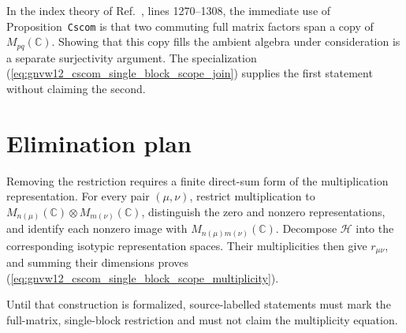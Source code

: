 \documentclass{article}
\begin{document}
In the index theory of Ref.~\cite{Gross2012IndexTheory}, lines 1270--1308, the
immediate use of Proposition~\texttt{Cscom} is that two commuting full matrix
factors span a copy of $M_{pq}(\mathbb C)$. Showing that this copy fills the
ambient algebra under consideration is a separate surjectivity argument. The specialization
(\ref{eq:gnvw12_cscom_single_block_scope_join}) supplies the first statement
without claiming the second.

\section{Elimination plan}

Removing the restriction requires a finite direct-sum form of the
multiplication representation. For every pair $(\mu,\nu)$, restrict
multiplication to
$M_{n(\mu)}(\mathbb C)\otimes M_{m(\nu)}(\mathbb C)$, distinguish the zero and
nonzero representations, and identify each nonzero image with
$M_{n(\mu)m(\nu)}(\mathbb C)$. Decompose $\mathcal H$ into the corresponding
isotypic representation spaces. Their multiplicities then give
$r_{\mu\nu}$, and summing their dimensions proves
(\ref{eq:gnvw12_cscom_single_block_scope_multiplicity}).

Until that construction is formalized, source-labelled statements must mark
the full-matrix, single-block restriction and must not claim the multiplicity
equation.



\end{document}
